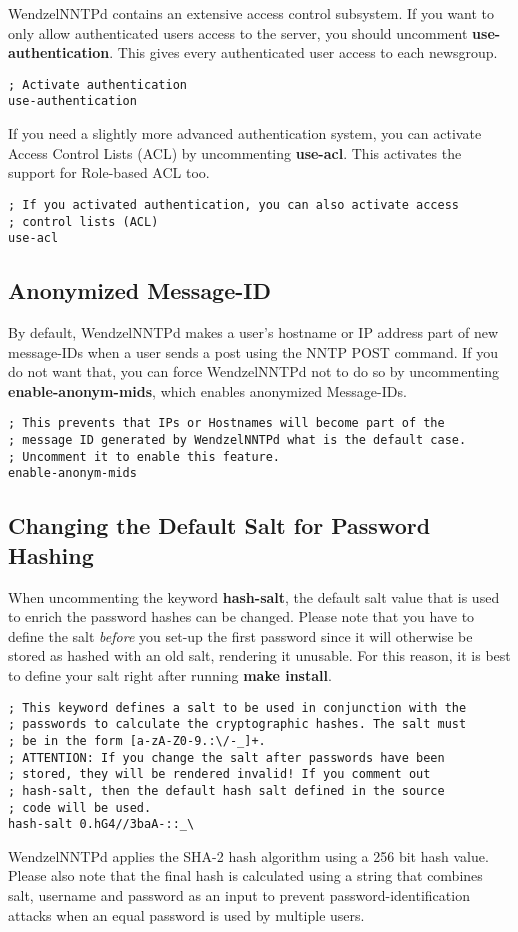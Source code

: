 WendzelNNTPd contains an extensive access control subsystem. If you want to only allow authenticated users access to the server, you should uncomment {\bf use-authentication}. This gives every authenticated user access to each newsgroup.

\begin{verbatim}
; Activate authentication
use-authentication
\end{verbatim}

If you need a slightly more advanced authentication system, you can activate Access Control Lists (ACL) by uncommenting {\bf use-acl}. This activates the support for Role-based ACL too.

\begin{verbatim}
; If you activated authentication, you can also activate access
; control lists (ACL)
use-acl
\end{verbatim}

\subsection{Anonymized Message-ID}

By default, WendzelNNTPd makes a user's hostname or IP address part of new message-IDs when a user sends a post using the NNTP POST command. If you do not want that, you can force WendzelNNTPd not to do so by uncommenting {\bf enable-anonym-mids}, which enables anonymized Message-IDs.

\begin{verbatim}
; This prevents that IPs or Hostnames will become part of the
; message ID generated by WendzelNNTPd what is the default case.
; Uncomment it to enable this feature.
enable-anonym-mids
\end{verbatim}

\subsection{Changing the Default Salt for Password Hashing}

When uncommenting the keyword {\bf hash-salt}, the default salt value that is used to enrich the password hashes can be changed. Please note that you have to define the salt {\it before} you set-up the first password since it will otherwise be stored as hashed with an old salt, rendering it unusable. For this reason, it is best to define your salt right after running {\bf make install}.

\begin{verbatim}
; This keyword defines a salt to be used in conjunction with the
; passwords to calculate the cryptographic hashes. The salt must
; be in the form [a-zA-Z0-9.:\/-_]+.
; ATTENTION: If you change the salt after passwords have been
; stored, they will be rendered invalid! If you comment out
; hash-salt, then the default hash salt defined in the source
; code will be used.
hash-salt 0.hG4//3baA-::_\
\end{verbatim}

WendzelNNTPd applies the SHA-2 hash algorithm using a 256 bit hash value. Please also note that the final hash is calculated using a string that combines salt, username and password as an input to prevent password-identification attacks when an equal password is used by multiple users.


